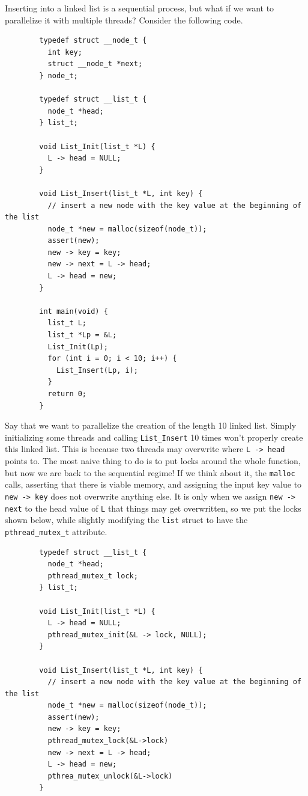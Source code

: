 \documentclass{article}
\begin{document}
    \begin{example}
      Inserting into a linked list is a sequential process, but what if we want to parallelize it with multiple threads? Consider the following code. 
      \begin{lstlisting}
        typedef struct __node_t {
          int key; 
          struct __node_t *next; 
        } node_t; 

        typedef struct __list_t {
          node_t *head; 
        } list_t; 

        void List_Init(list_t *L) {
          L -> head = NULL; 
        }

        void List_Insert(list_t *L, int key) {
          // insert a new node with the key value at the beginning of the list 
          node_t *new = malloc(sizeof(node_t)); 
          assert(new); 
          new -> key = key; 
          new -> next = L -> head; 
          L -> head = new; 
        }

        int main(void) {
          list_t L; 
          list_t *Lp = &L; 
          List_Init(Lp); 
          for (int i = 0; i < 10; i++) {
            List_Insert(Lp, i); 
          }
          return 0; 
        }
      \end{lstlisting}
      Say that we want to parallelize the creation of the length 10 linked list. Simply initializing some threads and calling \texttt{List\_Insert} 10 times won't properly create this linked list. This is because two threads may overwrite where \texttt{L -> head} points to. The most naive thing to do is to put locks around the whole function, but now we are back to the sequential regime! If we think about it, the \texttt{malloc} calls, asserting that there is viable memory, and assigning the input key value to \texttt{new -> key} does not overwrite anything else. It is only when we assign \texttt{new -> next} to the head value of \texttt{L} that things may get overwritten, so we put the locks shown below, while slightly modifying the \texttt{list} struct to have the \texttt{pthread\_mutex\_t} attribute. 
      \begin{lstlisting}
        typedef struct __list_t {
          node_t *head; 
          pthread_mutex_t lock; 
        } list_t; 

        void List_Init(list_t *L) {
          L -> head = NULL; 
          pthread_mutex_init(&L -> lock, NULL); 
        }

        void List_Insert(list_t *L, int key) {
          // insert a new node with the key value at the beginning of the list 
          node_t *new = malloc(sizeof(node_t)); 
          assert(new); 
          new -> key = key; 
          pthread_mutex_lock(&L->lock)
          new -> next = L -> head; 
          L -> head = new; 
          pthrea_mutex_unlock(&L->lock)
        }
      \end{lstlisting}
    \end{example}
\end{document}
